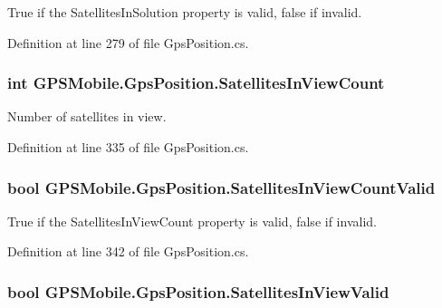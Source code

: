 True if the SatellitesInSolution property is valid, false if invalid. 

Definition at line 279 of file GpsPosition.cs.\hypertarget{class_g_p_s_mobile_1_1_gps_position_af125dc9f8b26690269c08483d1b7ffb0}{
\subsubsection[{SatellitesInViewCount}]{\setlength{\rightskip}{0pt plus 5cm}int GPSMobile.GpsPosition.SatellitesInViewCount}}
\label{class_g_p_s_mobile_1_1_gps_position_af125dc9f8b26690269c08483d1b7ffb0}


Number of satellites in view. 

Definition at line 335 of file GpsPosition.cs.\hypertarget{class_g_p_s_mobile_1_1_gps_position_a3a358ef10fea4c956bc5db879a18e89d}{
\subsubsection[{SatellitesInViewCountValid}]{\setlength{\rightskip}{0pt plus 5cm}bool GPSMobile.GpsPosition.SatellitesInViewCountValid}}
\label{class_g_p_s_mobile_1_1_gps_position_a3a358ef10fea4c956bc5db879a18e89d}


True if the SatellitesInViewCount property is valid, false if invalid. 

Definition at line 342 of file GpsPosition.cs.\hypertarget{class_g_p_s_mobile_1_1_gps_position_a6b4baeb146168192eb13fbbad8a1bdf7}{
\subsubsection[{SatellitesInViewValid}]{\setlength{\rightskip}{0pt plus 5cm}bool GPSMobile.GpsPosition.SatellitesInViewValid}}
\label{class_g_p_s_mobile_1_1_gps_position_a6b4baeb146168192eb13fbbad8a1bdf7}


